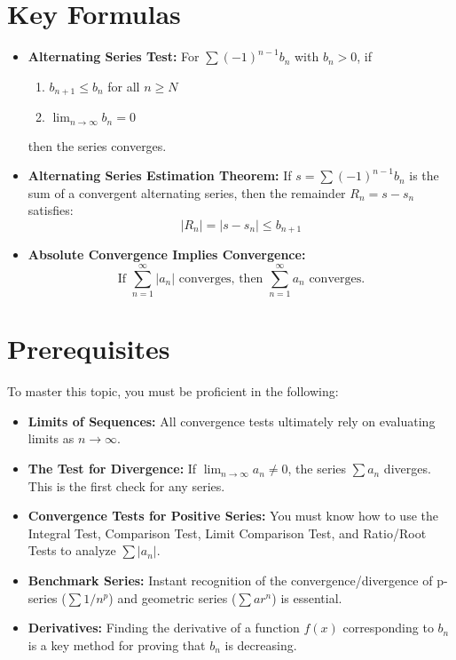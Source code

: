\documentclass{article}
\begin{document}
\section{Key Formulas}
\begin{itemize}
    \item \textbf{Alternating Series Test:} For $\sum (-1)^{n-1}b_n$ with $b_n>0$, if
    \begin{enumerate}
        \item $b_{n+1} \le b_n$ for all $n \ge N$
        \item $\lim_{n \to \infty} b_n = 0$
    \end{enumerate}
    then the series converges.
    
    \item \textbf{Alternating Series Estimation Theorem:} If $s = \sum (-1)^{n-1}b_n$ is the sum of a convergent alternating series, then the remainder $R_n = s-s_n$ satisfies:
    \[ |R_n| = |s - s_n| \le b_{n+1} \]
    
    \item \textbf{Absolute Convergence Implies Convergence:}
    \[ \text{If } \sum_{n=1}^{\infty} |a_n| \text{ converges, then } \sum_{n=1}^{\infty} a_n \text{ converges.} \]
\end{itemize}

\section{Prerequisites}
To master this topic, you must be proficient in the following:
\begin{itemize}
    \item \textbf{Limits of Sequences:} All convergence tests ultimately rely on evaluating limits as $n \to \infty$.
    \item \textbf{The Test for Divergence:} If $\lim_{n \to \infty} a_n \neq 0$, the series $\sum a_n$ diverges. This is the first check for any series.
    \item \textbf{Convergence Tests for Positive Series:} You must know how to use the Integral Test, Comparison Test, Limit Comparison Test, and Ratio/Root Tests to analyze $\sum|a_n|$.
    \item \textbf{Benchmark Series:} Instant recognition of the convergence/divergence of p-series ($\sum 1/n^p$) and geometric series ($\sum ar^n$) is essential.
    \item \textbf{Derivatives:} Finding the derivative of a function $f(x)$ corresponding to $b_n$ is a key method for proving that $b_n$ is decreasing.
\end{itemize}
\end{document}
